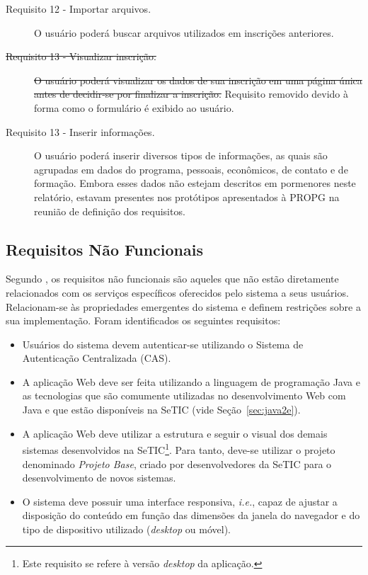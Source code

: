 \documentclass[
  10.5pt,				  %
	openright,			%
	twoside,			  %
  a5paper,
  chapter=TITLE,	%
	section=TITLE,	%
  hyphens,        %
	english,        %
	brazil          %
]{abntex2}
\begin{document}
\begin{description}
\item[Requisito 12 - Importar arquivos.] O usuário poderá buscar arquivos utilizados em inscrições anteriores.
\item[\sout{Requisito 13 - Visualizar inscrição.}] \sout{O usuário poderá visualizar os dados de sua inscrição em uma página única antes de decidir-se por finalizar a inscrição.} Requisito removido devido à forma como o formulário é exibido ao usuário.
\item[Requisito 13 - Inserir informações.] O usuário poderá inserir diversos tipos de informações, as quais são agrupadas em dados do programa, pessoais, econômicos, de contato e de formação. Embora esses dados não estejam descritos em pormenores neste relatório, estavam presentes nos protótipos apresentados à PROPG na reunião de definição dos requisitos.
\end{description}


\subsection{Requisitos Não Funcionais}

Segundo , os requisitos não funcionais são aqueles que não estão diretamente relacionados com os serviços específicos oferecidos pelo sistema a seus usuários. Relacionam-se às propriedades emergentes do sistema e definem restrições sobre a sua implementação. Foram identificados os seguintes requisitos:

\begin{itemize}
\item Usuários do sistema devem autenticar-se utilizando o Sistema de Autenticação Centralizada (CAS).
\item A aplicação Web deve ser feita utilizando a linguagem de programação Java e as tecnologias que são comumente utilizadas no desenvolvimento Web com Java e que estão disponíveis na SeTIC (vide Seção~\ref{sec:java2e}).
\item A aplicação Web deve utilizar a estrutura e seguir o visual dos demais sistemas desenvolvidos na SeTIC\footnote{Este requisito se refere à versão \emph{desktop} da aplicação.}. Para tanto, deve-se utilizar o projeto denominado \emph{Projeto Base}, criado por desenvolvedores da SeTIC para o desenvolvimento de novos sistemas.
\item O sistema deve possuir uma interface responsiva, \emph{i.e.}, capaz de ajustar a disposição do conteúdo em função das dimensões da janela do navegador e do tipo de dispositivo utilizado (\emph{desktop} ou móvel). 
\end{itemize}
\end{document}
